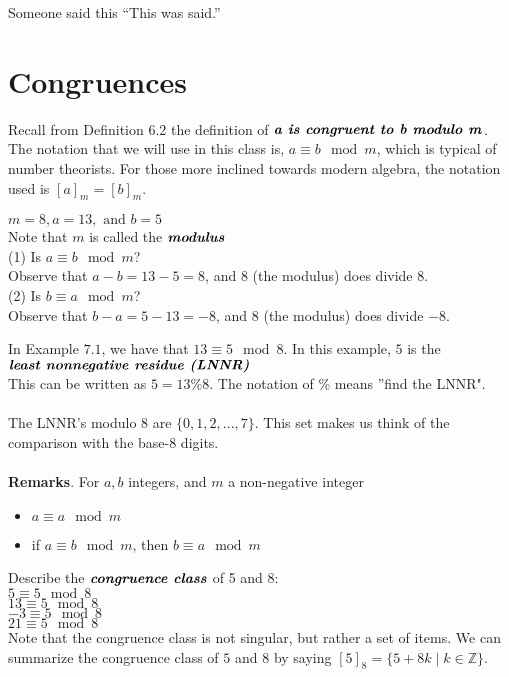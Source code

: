 \begin{chapquote}{Someone said this}
``This was said.''
\end{chapquote}

\section{Congruences}

Recall from Definition 6.2 the definition of $\textbf{\textit{a is congruent to b modulo m}}{}$. The notation that we will use in this class is, $a \equiv b \mod{m}$, which is typical of number theorists. For those more inclined towards modern algebra, the notation used is $[a]_m = [b]_m$.

\begin{example}
$m= 8, a = 13, \text{ and } b = 5$ \\ Note that $m$ is called the $\textbf{\textit{modulus}}{}$ \\ (1) Is $a \equiv b \mod{m}$? \\ \indent Observe that $a - b = 13 - 5 = 8$, and $8$ (the modulus) does divide $8$. \\
(2) Is $b \equiv a \mod{m}$? \\ 
\indent Observe that $b - a = 5 - 13 = -8$, and $8$ (the modulus) does divide $-8$.
\end{example}

In Example $7.1$, we have that $13 \equiv 5 \mod{8}$. In this example, $5$ is the $\textbf{\textit{least nonnegative residue (LNNR)}}{}$ \\ This can be written as $5 = 13 \% 8$. The notation of \% means ''find the LNNR".
\\
\\
The LNNR's modulo $8$ are $\{0, 1, 2, . . ., 7\}$. This set makes us think of the comparison with the base-8 digits.
\\
\\
\textbf{Remarks}. For $a, b$ integers, and $m$ a non-negative integer
\\
\begin{itemize}
\item $a \equiv a \mod{m}$
\item if $a \equiv b \mod{m}$, then $b \equiv a \mod{m}$
\end{itemize}

\begin{example}
Describe the $\textbf{\textit{congruence class}}{}$ of 5 and 8: \\
$5 \equiv 5 \mod{8}$ \\
$13 \equiv 5 \mod{8}$ \\
$-3 \equiv 5 \mod{8}$ \\
$21 \equiv 5 \mod{8}$ \\
Note that the congruence class is not singular, but rather a set of items. We can summarize the congruence class of $5$ and $8$ by saying $[5]_8 = \{ 5 + 8 k \mid k \in \mathbb{Z}\}$.
\end{example}

